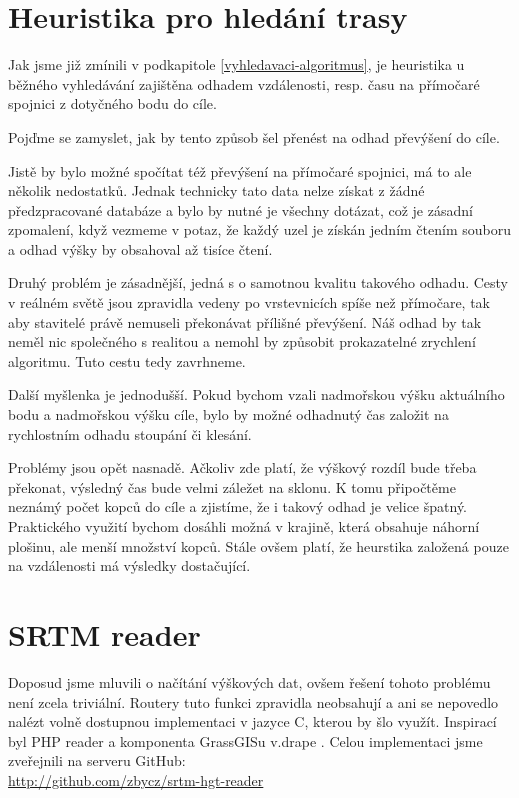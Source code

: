 \documentclass[thesis=B,czech]{FITthesis}[2012/06/26]
\begin{document}
\section{Heuristika pro hledání trasy}
Jak jsme již zmínili v podkapitole \ref{vyhledavaci-algoritmus}, je heuristika u běžného vyhledávání zajištěna odhadem vzdálenosti, resp. času na přímočaré spojnici z dotyčného bodu do cíle.

Pojďme se zamyslet, jak by tento způsob šel přenést na odhad převýšení do cíle. 

Jistě by bylo možné spočítat též převýšení na přímočaré spojnici, má to ale několik nedostatků. Jednak technicky tato data nelze získat z žádné předzpracované databáze a bylo by nutné je všechny dotázat, což je zásadní zpomalení, když vezmeme v potaz, že každý uzel je získán jedním čtením souboru a odhad výšky by obsahoval až tisíce čtení.

Druhý problém je zásadnější, jedná s o samotnou kvalitu takového odhadu. Cesty v reálném světě jsou zpravidla vedeny po vrstevnicích spíše než přímočare, tak aby stavitelé právě nemuseli překonávat přílišné převýšení. Náš odhad by tak neměl nic společného s realitou a nemohl by způsobit prokazatelné zrychlení algoritmu. Tuto cestu tedy zavrhneme.

Další myšlenka je jednodušší. Pokud bychom vzali nadmořskou výšku aktuálního bodu a nadmořskou výšku cíle, bylo by možné odhadnutý čas založit na rychlostním odhadu stoupání či klesání. 

Problémy jsou opět nasnadě. Ačkoliv zde platí, že výškový rozdíl bude třeba překonat, výsledný čas bude velmi záležet na sklonu. K tomu připočtěme neznámý počet kopců do cíle a zjistíme, že i takový odhad je velice špatný. Praktického využití bychom dosáhli možná v krajině, která obsahuje náhorní plošinu, ale menší množství kopců. Stále ovšem platí, že heurstika založená pouze na vzdálenosti má výsledky dostačující.


\section{SRTM reader}
Doposud jsme mluvili o načítání výškových dat, ovšem řešení tohoto problému není zcela triviální. Routery tuto funkci zpravidla neobsahují a ani se nepovedlo nalézt volně dostupnou implementaci v jazyce C, kterou by šlo využít. Inspirací byl PHP reader \cite{osola} a komponenta GrassGISu v.drape \cite{grassgis}. Celou implementaci jsme zveřejnili na serveru GitHub: \\  \href{https://github.com/zbycz/srtm-hgt-reader}{http://github.com/zbycz/srtm-hgt-reader}
\end{document}

